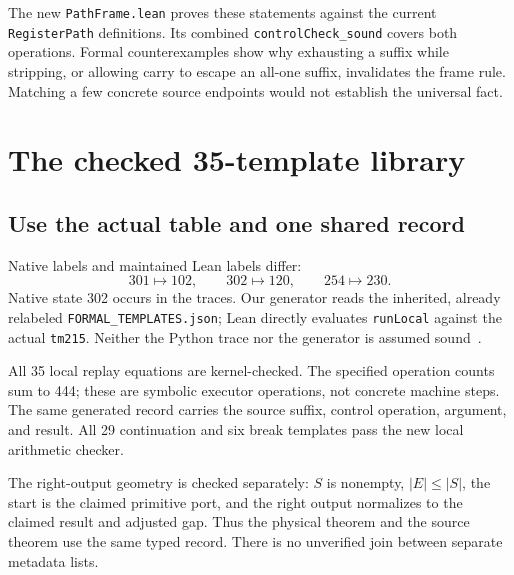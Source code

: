 The new \texttt{PathFrame.lean} proves these statements against the current \texttt{RegisterPath} definitions. Its combined \texttt{controlCheck\_sound} covers both operations. Formal counterexamples show why exhausting a suffix while stripping, or allowing carry to escape an all-one suffix, invalidates the frame rule. Matching a few concrete source endpoints would not establish the universal fact.

\section{The checked 35-template library}
\subsection{Use the actual table and one shared record}
Native labels and maintained Lean labels differ:
\[
 301\mapsto102,\qquad302\mapsto120,\qquad254\mapsto230.
\]
Native state 302 occurs in the traces. Our generator reads the inherited, already relabeled \texttt{FORMAL\_TEMPLATES.json}; Lean directly evaluates \texttt{runLocal} against the actual \texttt{tm215}. Neither the Python trace nor the generator is assumed sound~\cite{leftframe,table215}.

All 35 local replay equations are kernel-checked. The specified operation counts sum to 444; these are symbolic executor operations, not concrete machine steps. The same generated record carries the source suffix, control operation, argument, and result. All 29 continuation and six break templates pass the new local arithmetic checker.

The right-output geometry is checked separately: $S$ is nonempty, $|E|\le |S|$, the start is the claimed primitive port, and the right output normalizes to the claimed result and adjusted gap. Thus the physical theorem and the source theorem use the same typed record. There is no unverified join between separate metadata lists.

